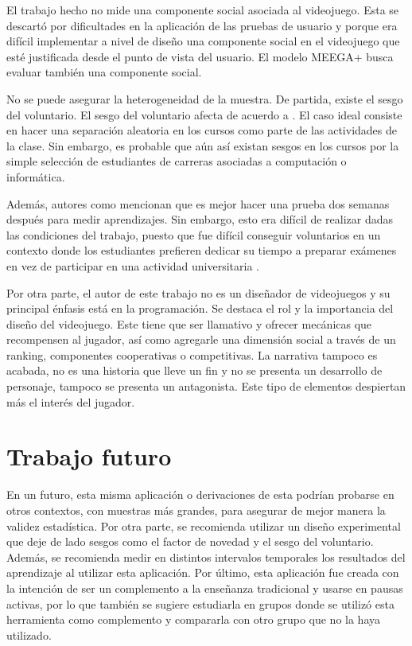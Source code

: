 El trabajo hecho no mide una componente social asociada al videojuego. Esta se descartó por dificultades en la aplicación de las pruebas de usuario y porque era difícil implementar a nivel de diseño una componente social en el videojuego que esté justificada desde el punto de vista del usuario. El modelo MEEGA+ \cite{meegaplus} busca evaluar también una componente social.

No se puede asegurar la heterogeneidad de la muestra. De partida, existe el sesgo del voluntario. El sesgo del voluntario afecta de acuerdo a \cite{volunterBias}. El caso ideal consiste en hacer una separación aleatoria en los cursos como parte de las actividades de la clase. Sin embargo, es probable que aún así existan sesgos en los cursos por la simple selección de estudiantes de carreras asociadas a computación o informática. %

Además, autores como mencionan que es mejor hacer una prueba dos semanas después para medir aprendizajes. Sin embargo, esto era difícil de realizar dadas las condiciones del trabajo, puesto que fue difícil conseguir voluntarios en un contexto donde los estudiantes prefieren dedicar su tiempo a preparar exámenes en vez de participar en una actividad universitaria \cite{Rogers2002InteractionDB}.

Por otra parte, el autor de este trabajo no es un diseñador de videojuegos y su principal énfasis está en la programación. Se destaca el rol y la importancia del diseño del videojuego. Este tiene que ser llamativo y ofrecer mecánicas que recompensen al jugador, así como agregarle una dimensión social a través de un ranking, componentes cooperativas o competitivas. La narrativa tampoco es acabada, no es una historia que lleve un fin y no se presenta un desarrollo de personaje, tampoco se presenta un antagonista. Este tipo de elementos despiertan más el interés del jugador.

\section{Trabajo futuro}


En un futuro, esta misma aplicación o derivaciones de esta podrían probarse en otros contextos, con muestras más grandes, para asegurar de mejor manera la validez estadística. Por otra parte, se recomienda utilizar un diseño experimental que deje de lado sesgos como el factor de novedad y el sesgo del voluntario. Además, se recomienda medir en distintos intervalos temporales los resultados del aprendizaje al utilizar esta aplicación. Por último, esta aplicación fue creada con la intención de ser un complemento a la enseñanza tradicional y usarse en pausas activas, por lo que también se sugiere estudiarla en grupos donde se utilizó esta herramienta como complemento y compararla con otro grupo que no la haya utilizado.

